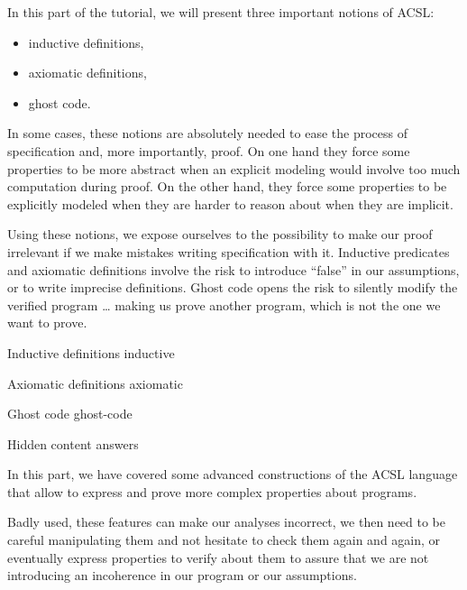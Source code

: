 In this part of the tutorial, we will present three important notions of ACSL:

\begin{itemize}
\item inductive definitions,
\item axiomatic definitions,
\item ghost code.
\end{itemize}


In some cases, these notions are absolutely needed to ease the process of
specification and, more importantly, proof. On one hand they force some
properties to be more abstract when an explicit modeling would involve too much
computation during proof. On the other hand, they force some properties to be
explicitly modeled when they are harder to reason about when they are implicit.

Using these notions, we expose ourselves to the possibility to make our
proof irrelevant if we make mistakes writing specification with it. Inductive
predicates and axiomatic definitions involve the risk to introduce ``false'' in
our assumptions, or to write imprecise definitions. Ghost code opens the risk
to silently modify the verified program \ldots{} making us prove another program,
which is not the one we want to prove.


\begin{levelTwo}
  {Inductive definitions}
  {inductive}
\end{levelTwo}

\begin{levelTwo}
  {Axiomatic definitions}
  {axiomatic}
\end{levelTwo}

\begin{levelTwo}
  {Ghost code}
  {ghost-code}
\end{levelTwo}

\begin{levelTwo}
  {Hidden content}
  {answers}
\end{levelTwo}


\horizontalLine
\newpage


In this part, we have covered some advanced constructions of the ACSL
language that allow to express and prove more complex properties about
programs.

Badly used, these features can make our analyses incorrect, we then need
to be careful manipulating them and not hesitate to check them again and
again, or eventually express properties to verify about them to assure
that we are not introducing an incoherence in our program or our
assumptions.
